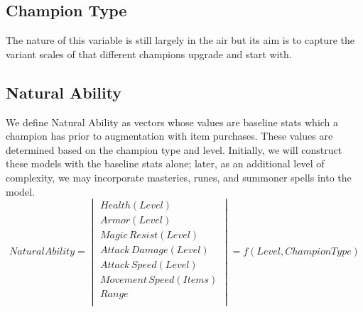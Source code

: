 \documentclass{article}
\begin{document}
\subsection{Champion Type}
The nature of this variable is still largely in the air but its aim is to capture the variant scales of that different champions upgrade and start with.

\subsection{Natural Ability}
We define Natural Ability as vectors whose values are baseline stats which a champion has prior to augmentation with item purchases.  These values are determined based on the champion type and level.  Initially, we will construct these models with the baseline stats alone; later, as an additional level of complexity, we may incorporate masteries, runes, and summoner spells into the model.
\begin{equation}
Natural Ability = 
\begin{vmatrix}
	Health(Level)\\
	Armor(Level) \\
	Magic\hspace{2pt}Resist(Level)\\
	Attack\hspace{2pt}Damage(Level)\\
	Attack\hspace{2pt}Speed(Level)\\
	Movement\hspace{2pt}Speed(Items)\\
	Range \\
\end{vmatrix} = f(Level, Champion Type)
\end{equation}
\end{document}
